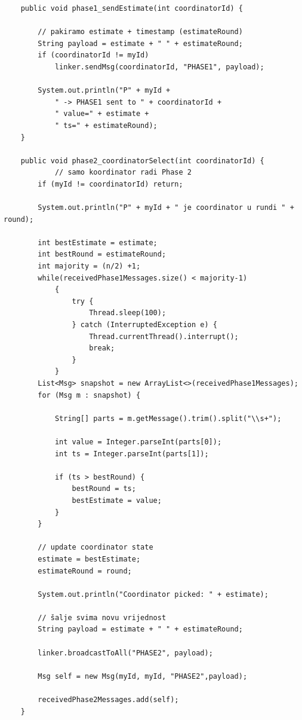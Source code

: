 \documentclass[11pt,a4paper]{article}
\begin{document}
\begin{lstlisting}
    public void phase1_sendEstimate(int coordinatorId) {

        // pakiramo estimate + timestamp (estimateRound)
        String payload = estimate + " " + estimateRound;
        if (coordinatorId != myId)
            linker.sendMsg(coordinatorId, "PHASE1", payload);

        System.out.println("P" + myId +
            " -> PHASE1 sent to " + coordinatorId +
            " value=" + estimate +
            " ts=" + estimateRound);
    }

    public void phase2_coordinatorSelect(int coordinatorId) {
            // samo koordinator radi Phase 2
        if (myId != coordinatorId) return;

        System.out.println("P" + myId + " je coordinator u rundi " + round);

        int bestEstimate = estimate;
        int bestRound = estimateRound;
        int majority = (n/2) +1;
        while(receivedPhase1Messages.size() < majority-1)
            {
                try {
                    Thread.sleep(100);
                } catch (InterruptedException e) {
                    Thread.currentThread().interrupt();
                    break;
                }
            }
        List<Msg> snapshot = new ArrayList<>(receivedPhase1Messages);
        for (Msg m : snapshot) {

            String[] parts = m.getMessage().trim().split("\\s+");

            int value = Integer.parseInt(parts[0]);
            int ts = Integer.parseInt(parts[1]);

            if (ts > bestRound) {
                bestRound = ts;
                bestEstimate = value;
            }
        }

        // update coordinator state
        estimate = bestEstimate;
        estimateRound = round;

        System.out.println("Coordinator picked: " + estimate);

        // šalje svima novu vrijednost
        String payload = estimate + " " + estimateRound;

        linker.broadcastToAll("PHASE2", payload);

        Msg self = new Msg(myId, myId, "PHASE2",payload);

        receivedPhase2Messages.add(self);
    }
\end{lstlisting}
\end{document}
